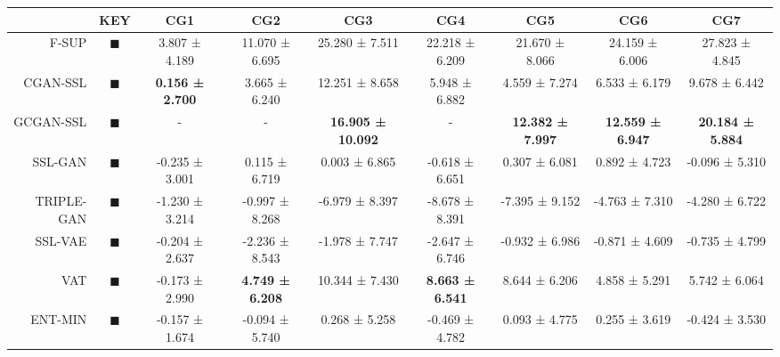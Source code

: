 \begin{tabular}{rcccccccc}
\toprule
{} &                                                                      KEY &                     CG1 &                     CG2 &                       CG3 &                     CG4 &                      CG5 &                      CG6 &                      CG7 \\
\midrule
F-SUP      &           \textcolor{FULLY_SUPERVISED_CLASSIFIER}{\LARGE $\blacksquare$} &           3.807 ± 4.189 &          11.070 ± 6.695 &            25.280 ± 7.511 &          22.218 ± 6.209 &           21.670 ± 8.066 &           24.159 ± 6.006 &           27.823 ± 4.845 \\
CGAN-SSL   &   \textcolor{CGAN_BASIC_DJ_SUPERVISED_CLASSIFIER}{\LARGE $\blacksquare$} &  \textbf{0.156 ± 2.700} &           3.665 ± 6.240 &            12.251 ± 8.658 &           5.948 ± 6.882 &            4.559 ± 7.274 &            6.533 ± 6.179 &            9.678 ± 6.442 \\
GCGAN-SSL  &  \textcolor{CGAN_GUMBEL_DJ_SUPERVISED_CLASSIFIER}{\LARGE $\blacksquare$} &               - &               - &  \textbf{16.905 ± 10.092} &               - &  \textbf{12.382 ± 7.997} &  \textbf{12.559 ± 6.947} &  \textbf{20.184 ± 5.884} \\
SSL-GAN    &                               \textcolor{SSL_GAN}{\LARGE $\blacksquare$} &          -0.235 ± 3.001 &           0.115 ± 6.719 &             0.003 ± 6.865 &          -0.618 ± 6.651 &            0.307 ± 6.081 &            0.892 ± 4.723 &           -0.096 ± 5.310 \\
TRIPLE-GAN &                            \textcolor{TRIPLE_GAN}{\LARGE $\blacksquare$} &          -1.230 ± 3.214 &          -0.997 ± 8.268 &            -6.979 ± 8.397 &          -8.678 ± 8.391 &           -7.395 ± 9.152 &           -4.763 ± 7.310 &           -4.280 ± 6.722 \\
SSL-VAE    &                               \textcolor{SSL_VAE}{\LARGE $\blacksquare$} &          -0.204 ± 2.637 &          -2.236 ± 8.543 &            -1.978 ± 7.747 &          -2.647 ± 6.746 &           -0.932 ± 6.986 &           -0.871 ± 4.609 &           -0.735 ± 4.799 \\
VAT        &                                   \textcolor{VAT}{\LARGE $\blacksquare$} &          -0.173 ± 2.990 &  \textbf{4.749 ± 6.208} &            10.344 ± 7.430 &  \textbf{8.663 ± 6.541} &            8.644 ± 6.206 &            4.858 ± 5.291 &            5.742 ± 6.064 \\
ENT-MIN    &                  \textcolor{ENTROPY_MINIMISATION}{\LARGE $\blacksquare$} &          -0.157 ± 1.674 &          -0.094 ± 5.740 &             0.268 ± 5.258 &          -0.469 ± 4.782 &            0.093 ± 4.775 &            0.255 ± 3.619 &           -0.424 ± 3.530 \\

\end{tabular}
